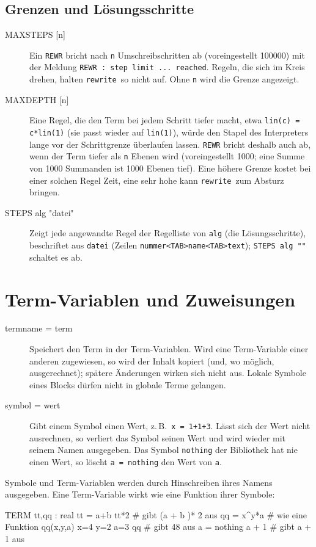 \documentclass[a4paper,11pt]{article}
\newcommand{\rw}{\texttt{rewrite}}
\newcommand{\kw}[1]{\texttt{#1}}
\begin{document}
\subsection{Grenzen und Lösungsschritte}
\begin{description}
\item[MAXSTEPS {[}n{]}]
  Ein \kw{REWR} bricht nach \kw{n} Umschreibschritten ab (voreingestellt
  100000) mit der Meldung \kw{REWR : step limit ... reached}. Regeln, die
  sich im Kreis drehen, halten \rw\ so nicht auf. Ohne \kw{n} wird die
  Grenze angezeigt.
\item[MAXDEPTH {[}n{]}]
  Eine Regel, die den Term bei jedem Schritt tiefer macht, etwa
  \kw{lin(c) = c*lin(1)} (sie passt wieder auf \kw{lin(1)}), würde den
  Stapel des Interpreters lange vor der Schrittgrenze überlaufen lassen.
  \kw{REWR} bricht deshalb auch ab, wenn der Term tiefer als \kw{n} Ebenen
  wird (voreingestellt 1000; eine Summe von 1000 Summanden ist 1000 Ebenen
  tief). Eine höhere Grenze kostet bei einer solchen Regel Zeit, eine sehr
  hohe kann \rw\ zum Absturz bringen.
\item[STEPS alg "datei"]
  Zeigt jede angewandte Regel der Regelliste von \kw{alg} (die
  Lösungsschritte), beschriftet aus \kw{datei} (Zeilen
  \kw{nummer<TAB>name<TAB>text}); \kw{STEPS alg ""} schaltet es ab.
\end{description}

\section{Term-Variablen und Zuweisungen}\label{sec:zuweisung}
\begin{description}
\item[termname = term]
  Speichert den Term in der Term-Variablen. Wird eine Term-Variable einer
  anderen zugewiesen, so wird der Inhalt kopiert (und, wo möglich,
  ausgerechnet); spätere Änderungen wirken sich nicht aus. Lokale Symbole
  eines Blocks dürfen nicht in globale Terme gelangen.
\item[symbol = wert]
  Gibt einem Symbol einen Wert, z.\,B.\ \kw{x = 1+1+3}. Lässt sich der
  Wert nicht ausrechnen, so verliert das Symbol seinen Wert und wird
  wieder mit seinem Namen ausgegeben. Das Symbol \kw{nothing} der
  Bibliothek hat nie einen Wert, so löscht \kw{a = nothing} den Wert von
  \kw{a}.
\end{description}
Symbole und Term-Variablen werden durch Hinschreiben ihres Namens
ausgegeben. Eine Term-Variable wirkt wie eine Funktion ihrer Symbole:
\begin{beispiel}
TERM tt,qq : real
tt = a+b
tt*2                # gibt (a + b )* 2 aus
qq = x^y*a          # wie eine Funktion qq(x,y,a)
x=4
y=2
a=3
qq                  # gibt 48 aus
a = nothing
a + 1               # gibt a + 1 aus
\end{beispiel}
\end{document}
